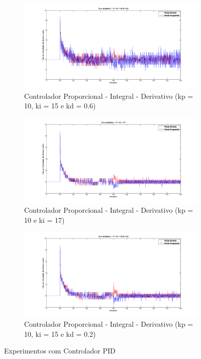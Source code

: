 \begin{figure}[!htb]
	\centering
	\begin{subfigure}{1.0\textwidth}
		\centering
		\includegraphics[width=.9\linewidth]{./Testes/Malha1/PID/m1_kp10ki15kd06}
		\caption{Controlador Proporcional - Integral - Derivativo (kp = 10, ki = 15 e kd = 0.6)}
		\label{fig:contPID2}
	\end{subfigure}
	\begin{subfigure}{1.0\textwidth}
		\centering
		\includegraphics[width=.9\linewidth]{./Testes/Malha1/PID/m1_kp10ki17}
		\caption{Controlador Proporcional - Integral - Derivativo (kp = 10 e ki = 17)}
		\label{fig:contPI2}
	\end{subfigure}
	\begin{subfigure}{1.0\textwidth}
		\centering
		\includegraphics[width=.9\linewidth]{./Testes/Malha1/PID/m1_kp10ki15kd02}
		\caption{Controlador Proporcional - Integral - Derivativo (kp = 10, ki = 15 e kd = 0.2)}
		\label{fig:contPIDP}
	\end{subfigure}
	\caption{Experimentos com Controlador PID}
	\label{fig:contPID}
\end{figure}



